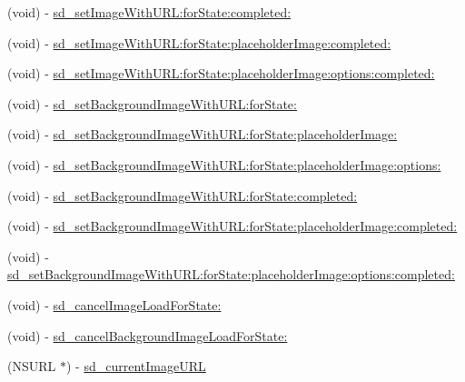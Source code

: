 \begin{DoxyCompactItemize}
\item 
(void) -\/ \mbox{\hyperlink{category_u_i_button_07_web_cache_08_abddfa42effe159e9f3089c474ad9753c}{sd\+\_\+set\+Image\+With\+U\+R\+L\+:for\+State\+:completed\+:}}
\item 
(void) -\/ \mbox{\hyperlink{category_u_i_button_07_web_cache_08_a2e2e51e7a885c288be6f071be9e4b2a0}{sd\+\_\+set\+Image\+With\+U\+R\+L\+:for\+State\+:placeholder\+Image\+:completed\+:}}
\item 
(void) -\/ \mbox{\hyperlink{category_u_i_button_07_web_cache_08_a45e790aa4c92ad7038a4be0d52a75187}{sd\+\_\+set\+Image\+With\+U\+R\+L\+:for\+State\+:placeholder\+Image\+:options\+:completed\+:}}
\item 
(void) -\/ \mbox{\hyperlink{category_u_i_button_07_web_cache_08_a089b2c745708bd54f980521be6755d59}{sd\+\_\+set\+Background\+Image\+With\+U\+R\+L\+:for\+State\+:}}
\item 
(void) -\/ \mbox{\hyperlink{category_u_i_button_07_web_cache_08_a3f02643dfa92d97060eb261d7025b4ec}{sd\+\_\+set\+Background\+Image\+With\+U\+R\+L\+:for\+State\+:placeholder\+Image\+:}}
\item 
(void) -\/ \mbox{\hyperlink{category_u_i_button_07_web_cache_08_a1ef909600a987eab6fa6aaeee38f4563}{sd\+\_\+set\+Background\+Image\+With\+U\+R\+L\+:for\+State\+:placeholder\+Image\+:options\+:}}
\item 
(void) -\/ \mbox{\hyperlink{category_u_i_button_07_web_cache_08_a1c472e78e9d0fbbd9bd54b06a83813f9}{sd\+\_\+set\+Background\+Image\+With\+U\+R\+L\+:for\+State\+:completed\+:}}
\item 
(void) -\/ \mbox{\hyperlink{category_u_i_button_07_web_cache_08_a0031ef09eb759d5337914e7a5866c42f}{sd\+\_\+set\+Background\+Image\+With\+U\+R\+L\+:for\+State\+:placeholder\+Image\+:completed\+:}}
\item 
(void) -\/ \mbox{\hyperlink{category_u_i_button_07_web_cache_08_a02dc89ea855c63ac6fdbc7595f13e577}{sd\+\_\+set\+Background\+Image\+With\+U\+R\+L\+:for\+State\+:placeholder\+Image\+:options\+:completed\+:}}
\item 
(void) -\/ \mbox{\hyperlink{category_u_i_button_07_web_cache_08_a29cb6b84260cc685f2b6d7c746a014d8}{sd\+\_\+cancel\+Image\+Load\+For\+State\+:}}
\item 
(void) -\/ \mbox{\hyperlink{category_u_i_button_07_web_cache_08_a1212bebc5d1a52a7e898c96fd128191d}{sd\+\_\+cancel\+Background\+Image\+Load\+For\+State\+:}}
\item 
(N\+S\+U\+RL $\ast$) -\/ \mbox{\hyperlink{category_u_i_button_07_web_cache_08_a8ea1e28175c50110fda5b08ccbcf9475}{sd\+\_\+current\+Image\+U\+RL}}

\end{DoxyCompactItemize}
